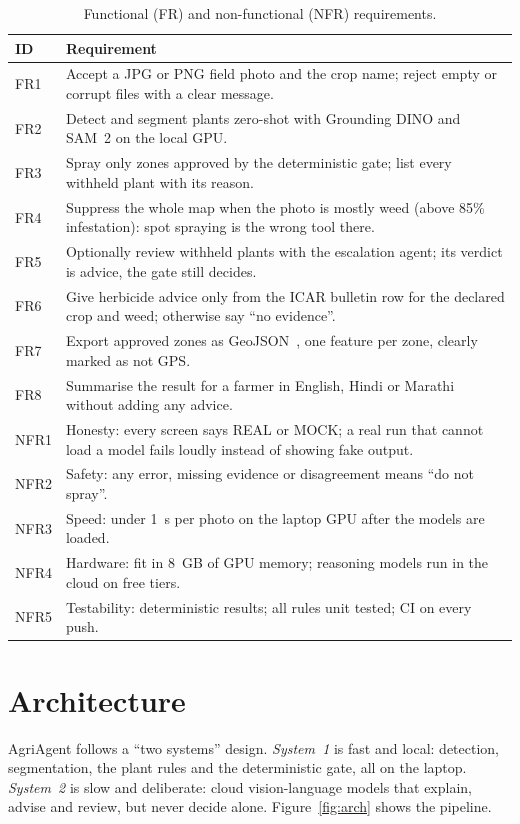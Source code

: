 \begin{table}[H]
\centering
\caption{Functional (FR) and non-functional (NFR) requirements.}\label{tab:req}
\begin{small}
\begin{tabularx}{\textwidth}{@{}lY@{}}
\toprule
\textbf{ID} & \textbf{Requirement}\\
\midrule
FR1 & Accept a JPG or PNG field photo and the crop name; reject empty or corrupt files with a clear message.\\
FR2 & Detect and segment plants zero-shot with Grounding DINO and SAM~2 on the local GPU.\\
FR3 & Spray only zones approved by the deterministic gate; list every withheld plant with its reason.\\
FR4 & Suppress the whole map when the photo is mostly weed (above 85\% infestation): spot spraying is the wrong tool there.\\
FR5 & Optionally review withheld plants with the escalation agent; its verdict is advice, the gate still decides.\\
FR6 & Give herbicide advice only from the ICAR bulletin row for the declared crop and weed; otherwise say ``no evidence''.\\
FR7 & Export approved zones as GeoJSON~\cite{rfc7946}, one feature per zone, clearly marked as not GPS.\\
FR8 & Summarise the result for a farmer in English, Hindi or Marathi without adding any advice.\\
NFR1 & Honesty: every screen says REAL or MOCK; a real run that cannot load a model fails loudly instead of showing fake output.\\
NFR2 & Safety: any error, missing evidence or disagreement means ``do not spray''.\\
NFR3 & Speed: under 1~s per photo on the laptop GPU after the models are loaded.\\
NFR4 & Hardware: fit in 8~GB of GPU memory; reasoning models run in the cloud on free tiers.\\
NFR5 & Testability: deterministic results; all rules unit tested; CI on every push.\\
\bottomrule
\end{tabularx}
\end{small}
\end{table}

\section{Architecture}
AgriAgent follows a ``two systems'' design. \emph{System~1} is fast and local: detection, segmentation,
the plant rules and the deterministic gate, all on the laptop. \emph{System~2} is slow and deliberate:
cloud vision-language models that explain, advise and review, but never decide alone.
Figure~\ref{fig:arch} shows the pipeline.

